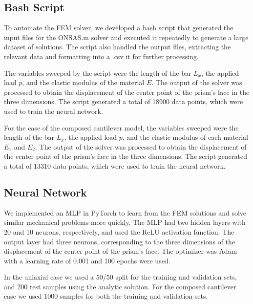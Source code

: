 \documentclass[11pt]{scrartcl} %
\begin{document}
\subsection{Bash Script}
To automate the FEM solver, we developed a bash script that generated the input files for the ONSAS.m solver and executed it repeatedly to generate a large dataset of solutions. The script also handled the output files, extracting the relevant data and formatting into a .csv it for further processing.

The variables sweeped by the script were the length of the bar $L_x$, the applied load $p$, and the elastic modulus of the material $E$. The output of the solver was processed to obtain the displacement of the center point of the prism's face in the three dimensions.  The script generated a total of 18900 data points, which were used to train the neural network.

For the case of the composed cantilever model, the variables sweeped were the length of the bar $L_x$, the applied load $p$, and the elastic modulus of each material $E_1$ and $E_2$. The output of the solver was processed to obtain the displacement of the center point of the prism's face in the three dimensions. The script generated a total of 13310 data points, which were used to train the neural network.


\subsection{Neural Network}
We implemented an MLP in PyTorch to learn from the FEM solutions and solve similar mechanical problems more quickly. The MLP had two hidden layers with 20 and 10 neurons, respectively, and used the ReLU activation function. The output layer had three neurons, corresponding to the three dimensions of the displacement of the center point of the prism's face. The optimizer was Adam with a learning rate of 0.001 and 100 epochs were used. 

In the uniaxial case we used a 50/50 split for the training and validation sets, and 200 test samples using the analytic solution. For the composed cantilever case we used 1000 samples for both the training and validation sets.
\end{document}
